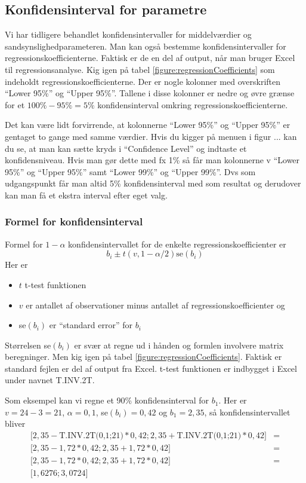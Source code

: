\subsection{Konfidensinterval for parametre}
Vi har tidligere behandlet konfidensintervaller for middelværdier og sandsynslighedparameteren. Man kan også bestemme konfidensintervaller for regressionskoefficienterne. Faktisk er de en del af output, når man bruger Excel til regressionsanalyse. Kig igen på tabel \ref{figure:regressionCoefficients} som indeholdt regressionskoefficienterne. Der er nogle kolonner med overskriften ``Lower 95\%'' og ``Upper 95\%''. Tallene i disse kolonner er nedre og øvre grænse for et \(100\% - 95\% = 5\%\) konfidensinterval omkring regressionskoefficienterne.

Det kan være lidt forvirrende, at kolonnerne ``Lower 95\%'' og ``Upper 95\%'' er gentaget to gange med samme værdier. Hvis du kigger på menuen i figur ... kan du se, at man kan sætte kryds i ``Confidence Level'' og indtaste et konfidensniveau. Hvis man gør dette med fx 1\% så får man kolonnerne v ``Lower 95\%'' og ``Upper 95\%'' samt  ``Lower 99\%'' og ``Upper 99\%''. Dvs som udgangspunkt får man altid 5\% konfidensinterval med som resultat og derudover kan man få et ekstra interval efter eget valg.

\subsubsection{Formel for konfidensinterval}
Formel for \(1 - \alpha\) konfidensintervallet for de enkelte regressionskoefficienter er
\begin{displaymath}
    b_i \pm t(v, 1 - \alpha / 2) \textrm{se}(b_i)
\end{displaymath}
Her er
\begin{itemize}
    \item \(t\) t-test funktionen
    \item \(v\) er antallet af observationer minus antallet af regressionskoefficienter og
    \item se\((b_i)\) er ``standard error'' for \(b_i\)
\end{itemize}
Størrelsen se\((b_i)\) er svær at regne ud i hånden og formlen involvere matrix beregninger. Men kig igen på tabel \ref{figure:regressionCoefficients}. Faktisk er standard fejlen er del af output fra Excel. t-test funktionen er indbygget i Excel under navnet T.INV.2T.

Som eksempel kan vi regne et 90\% konfidensinterval for \(b_1\). Her er \(v=24-3=21\), \(\alpha=0,1\), se\((b_i) = 0,42\) og \(b_1=2,35\), så konfidensintervallet bliver
\begin{align}
    \Big[2,35 - \textrm{T.INV.2T(0,1;21)} * 0,42 ;  2,35 + \textrm{T.INV.2T(0,1;21)} * 0,42 \Big] &= \\
    \Big[2,35 - 1,72 * 0,42 ;  2,35 + 1,72 * 0,42 \Big] &= \\
    \Big[2,35 - 1,72 * 0,42 ;  2,35 + 1,72 * 0,42 \Big] &= \\
    \Big[1,6276 ; 3,0724\Big]
\end{align}

